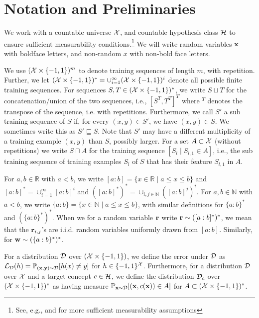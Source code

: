 \section{Notation and Preliminaries}\label{sec:notation}

We work with a countable universe $\mathcal{X}$, and countable hypothesis class $\mathcal{H}$ to ensure sufficient measurability conditions.\footnote{See, e.g., \cite{measureone} and  \cite{measuretwo} for more sufficient measurability assumptions} We will write random variables $ \mathbf{x} $ with boldface letters, and non-random $ x $ with non-bold face letters.  

We use $(\mathcal{X}\times\{-1,1\})^{m}$ to denote training sequences of length $m$, with repetition. Further, we let $(\mathcal{X}\times\{-1,1\})^{*}=\cup_{i=1}^{\infty}(\mathcal{X}\times\{-1,1\})^{i}$ denote all possible finite training sequences. For sequences $S,T\in (\mathcal{X}\times\{-1,1\})^{*}$, we write $S\sqcup T$ for the concatenation/union of the two sequences, i.e., $[S^T,T^T]^T$ where $^{T}$ denotes the transpose of the sequence, i.e. with repetitions. Furthermore, we call $ S' $  a sub training sequence of $ S $ if, for every $ (x,y)\in S' $, we have $ (x,y)\in S $. We sometimes write this as $S'\sqsubseteq S$. Note that $ S' $ may have a different multiplicity of a training example $ (x,y) $ than $ S $, possibly larger. For a set $A\subset \mathcal{X}$ (without repetitions) we write $S\sqcap A$ for the training sequence $[S_{l}\mid S_{l,1}\in A]$, i.e., the sub training sequence of training examples $S_{l}$ of $S$ that has their feature $S_{l,1}$ in $A$.    

For $ a,b\in \mathbb{R} $ with $ a<b $, we write $ [a:b]=\{ x\in\mathbb{R} \mid a\leq x\leq b  \} $ and $ [a:b]^{*}=\cup_{i=1}^{\infty}[a:b]^{i} $ and $ ([a:b]^{*})^{*}=\cup_{i,j\in \mathbb{N}}([a:b]^{j})^{i} $. For $ a,b\in \mathbb{N} $ with $ a<b $, we write $ \{  a:b\}=\{ x\in\mathbb{N} \mid a\leq x \leq b \} $, with similar definitions for $ \{ a:b \}^{*} $ and $ (\{ a:b \}^{*} )^{*}$. When we for a random variable $ \mathbf{r} $ write $ \mathbf{r}\sim ([a:b]^{*})^{*} $, we mean that the $ \mathbf{r}_{i,j} $'s are i.i.d. random variables uniformly drawn from $ [a:b] $. Similarly, for $ \mathbf{w} \sim (\{ a:b \}^{*})^{*} $.  


For a distribution $ \mathcal{D} $ over $ (\mathcal{X}\times \{-1,1\}) $, we define the error under $ \mathcal{D} $ as  $ \operatorname{\mathcal{L}}_{\mathcal{D}}(h)=\mathbb{P}_{(\mathbf{x},\mathbf{y})\sim \mathcal{D}}[h(x)\not=y]$ for $ h\in\{-1,1\}^{\mathcal{X}} $. Furthermore, for a distribution $ \mathcal{D} $ over $ \mathcal{X} $  and a target concept $ c \in \mathcal{H}$, we define the distribution $ \mathcal{D}_{c} $ over $ (\mathcal{X}\times \{-1,1\})^{*} $  as having measure $ \mathbb{P}_{\mathbf{x}\sim \mathcal{D}}[(\mathbf{x},c(\mathbf{x}))\in A] $ for $ A \subset (\mathcal{X}\times \{-1,1\})^{*}$.  

